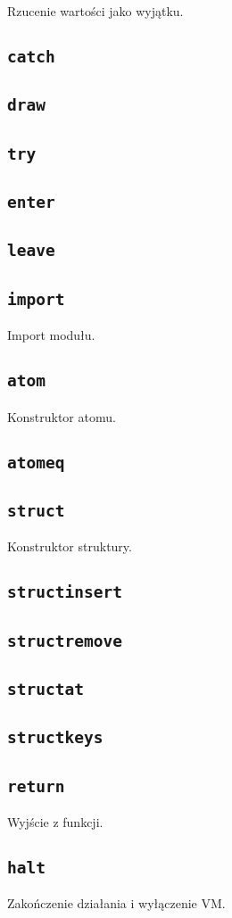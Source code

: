 Rzucenie wartości jako wyjątku.

\subsection{\texttt{catch}}
\subsection{\texttt{draw}}
\subsection{\texttt{try}}
\subsection{\texttt{enter}}
\subsection{\texttt{leave}}

\subsection{\texttt{import}}

Import modułu.

\subsection{\texttt{atom}}

Konstruktor atomu.

\subsection{\texttt{atomeq}}

\subsection{\texttt{struct}}

Konstruktor struktury.

\subsection{\texttt{structinsert}}
\subsection{\texttt{structremove}}
\subsection{\texttt{structat}}
\subsection{\texttt{structkeys}}

\subsection{\texttt{return}}

Wyjście z funkcji.

\subsection{\texttt{halt}}

Zakończenie działania i wyłączenie VM.
